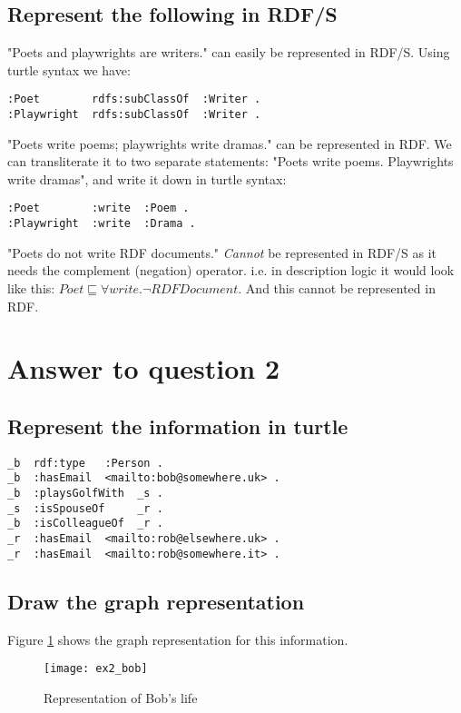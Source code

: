 \documentclass[a4paper,12pt]{article}
\begin{document}
\subsection[RDF/S]{Represent the following in RDF/S}

"Poets and playwrights are writers." can easily be represented in RDF/S.
Using turtle syntax we have:
\begin{Verbatim}[samepage=true]
:Poet        rdfs:subClassOf  :Writer .
:Playwright  rdfs:subClassOf  :Writer .
\end{Verbatim}

"Poets write poems; playwrights write dramas." can be represented in RDF.  We
can transliterate it to two separate statements:  "Poets write poems.
Playwrights write dramas", and write it down in turtle syntax:
\begin{Verbatim}[samepage=true]
:Poet        :write  :Poem .
:Playwright  :write  :Drama .
\end{Verbatim}

"Poets do not write RDF documents." \emph{Cannot} be represented in RDF/S as it
needs the complement (negation) operator.  i.e. in description logic it would
look like this: $Poet \sqsubseteq \forall write . \neg RDFDocument$.  And this
cannot be represented in RDF.

\section[Question 2]{Answer to question 2}

\subsection[Turtle]{Represent the information in turtle}
\begin{Verbatim}[samepage=true]
_b  rdf:type   :Person .
_b  :hasEmail  <mailto:bob@somewhere.uk> .
_b  :playsGolfWith  _s .
_s  :isSpouseOf     _r .
_b  :isColleagueOf  _r .
_r  :hasEmail  <mailto:rob@elsewhere.uk> .
_r  :hasEmail  <mailto:rob@somewhere.it> .
\end{Verbatim}

\subsection[Graph]{Draw the graph representation}
Figure \ref{bobslife} shows the graph representation for this information.
\begin{figure}[!htp]
\centering
\texttt{[image: ex2\_bob]}
\caption{Representation of Bob's life}
\label{bobslife}
\end{figure}
\end{document}
